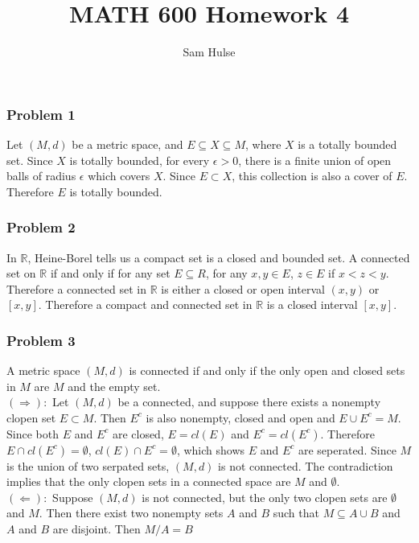 \documentclass[10pt,a4paper]{article}
\title{MATH 600 Homework 4}
\author{Sam Hulse}
\newcommand{\R}{\mathbb{R}}
\begin{document}
\maketitle

\subsubsection{Problem 1}
Let $(M, d)$ be a metric space, and $E \subseteq X \subseteq M$,  where $X$ is a totally bounded set. Since $X$ is totally bounded, for every $\epsilon > 0$, there is a finite union of open balls of radius $\epsilon$ which covers $X$. Since $E \subset X$, this collection is also a cover of $E$. Therefore $E$ is totally bounded.

\subsubsection{Problem 2}
In $\R$, Heine-Borel tells us a compact set is a closed and bounded set. A connected set on $\R$ if and only if for any set $E \subseteq R$, for any $x, y \in E$, $z \in E$ if $x < z < y$. Therefore a connected set in $\R$ is either a closed or open interval $(x, y)$ or $[x, y]$. Therefore a compact and connected set in $\R$ is a closed interval $[x, y]$.

\subsubsection{Problem 3}
A metric space $(M, d)$ is connected if and only if the only open and closed sets in $M$ are $M$ and the empty set.\\

$(\Rightarrow):$ Let $(M, d)$ be a connected, and suppose there exists a nonempty clopen set $E \subset M$. Then $E^c$ is also nonempty, closed and open and $E \cup E^c = M$. Since both $E$ and $E^c$ are closed, $E = cl(E)$ and $E^c = cl(E^c)$. Therefore $E \cap cl(E^c) = \emptyset$, $cl(E) \cap E^c = \emptyset$, which shows $E$ and $E^c$ are seperated. Since $M$ is the union of two serpated sets, $(M, d)$ is not connected. The contradiction implies that the only clopen sets in a connected space are $M$ and $\emptyset$.\\

$(\Leftarrow):$ Suppose $(M, d)$ is not connected, but the only two clopen sets are $\emptyset$ and $M$. Then there exist two nonempty sets $A$ and $B$ such that $M \subseteq A \cup B$ and $A$ and $B$ are disjoint. Then $M / A = B$
\end{document}
